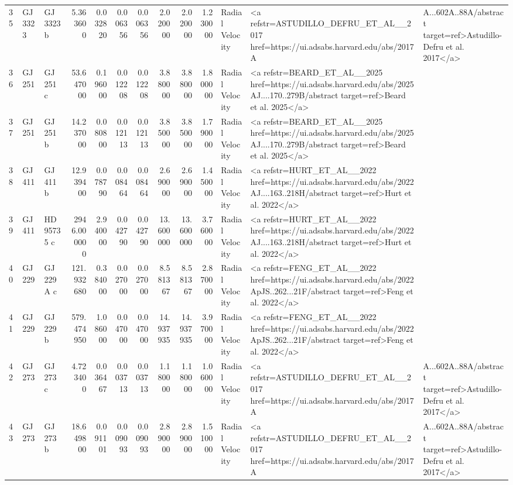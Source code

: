 \begin{tabular}{lllrrrrrrrll}
35 & GJ 3323 & GJ 3323 b & 5.363600 & 0.032820 & 0.006356 & 0.006356 & 2.020000 & 2.020000 & 1.230000 & Radial Velocity & <a refstr=ASTUDILLO_DEFRU_ET_AL__2017 href=https://ui.adsabs.harvard.edu/abs/2017A&A...602A..88A/abstract target=ref>Astudillo-Defru et al. 2017</a> \\
36 & GJ 251 & GJ 251 c & 53.647000 & 0.196000 & 0.012208 & 0.012208 & 3.880000 & 3.880000 & 1.800000 & Radial Velocity & <a refstr=BEARD_ET_AL__2025 href=https://ui.adsabs.harvard.edu/abs/2025AJ....170..279B/abstract target=ref>Beard et al. 2025</a> \\
37 & GJ 251 & GJ 251 b & 14.237000 & 0.080800 & 0.012113 & 0.012113 & 3.850000 & 3.850000 & 1.790000 & Radial Velocity & <a refstr=BEARD_ET_AL__2025 href=https://ui.adsabs.harvard.edu/abs/2025AJ....170..279B/abstract target=ref>Beard et al. 2025</a> \\
38 & GJ 411 & GJ 411 b & 12.939400 & 0.078790 & 0.008464 & 0.008464 & 2.690000 & 2.690000 & 1.450000 & Radial Velocity & <a refstr=HURT_ET_AL__2022 href=https://ui.adsabs.harvard.edu/abs/2022AJ....163..218H/abstract target=ref>Hurt et al. 2022</a> \\
39 & GJ 411 & HD 95735 c & 2946.000000 & 2.940000 & 0.042790 & 0.042790 & 13.600000 & 13.600000 & 3.760000 & Radial Velocity & <a refstr=HURT_ET_AL__2022 href=https://ui.adsabs.harvard.edu/abs/2022AJ....163..218H/abstract target=ref>Hurt et al. 2022</a> \\
40 & GJ 229 & GJ 229 A c & 121.932680 & 0.384000 & 0.027000 & 0.027000 & 8.581367 & 8.581367 & 2.870000 & Radial Velocity & <a refstr=FENG_ET_AL__2022 href=https://ui.adsabs.harvard.edu/abs/2022ApJS..262...21F/abstract target=ref>Feng et al. 2022</a> \\
41 & GJ 229 & GJ 229 b & 579.474950 & 1.086000 & 0.047000 & 0.047000 & 14.937935 & 14.937935 & 3.970000 & Radial Velocity & <a refstr=FENG_ET_AL__2022 href=https://ui.adsabs.harvard.edu/abs/2022ApJS..262...21F/abstract target=ref>Feng et al. 2022</a> \\
42 & GJ 273 & GJ 273 c & 4.723400 & 0.036467 & 0.003713 & 0.003713 & 1.180000 & 1.180000 & 1.060000 & Radial Velocity & <a refstr=ASTUDILLO_DEFRU_ET_AL__2017 href=https://ui.adsabs.harvard.edu/abs/2017A&A...602A..88A/abstract target=ref>Astudillo-Defru et al. 2017</a> \\
43 & GJ 273 & GJ 273 b & 18.649800 & 0.091101 & 0.009093 & 0.009093 & 2.890000 & 2.890000 & 1.510000 & Radial Velocity & <a refstr=ASTUDILLO_DEFRU_ET_AL__2017 href=https://ui.adsabs.harvard.edu/abs/2017A&A...602A..88A/abstract target=ref>Astudillo-Defru et al. 2017</a> \\

\end{tabular}
